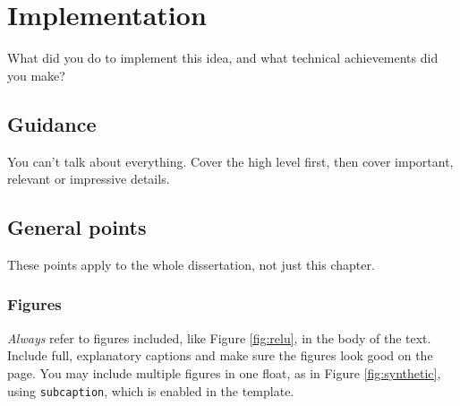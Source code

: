 \documentclass{l4proj}
\begin{document}
\chapter{Implementation}


What did you do to implement this idea, and what technical achievements did you make?
\section{Guidance}
You can't talk about everything. Cover the high level first, then cover important, relevant or impressive details.



\section{General points}

These points apply to the whole dissertation, not just this chapter.



\subsection{Figures}
\emph{Always} refer to figures included, like Figure \ref{fig:relu}, in the body of the text. Include full, explanatory captions and make sure the figures look good on the page.
You may include multiple figures in one float, as in Figure \ref{fig:synthetic}, using \texttt{subcaption}, which is enabled in the template.
\end{document}
